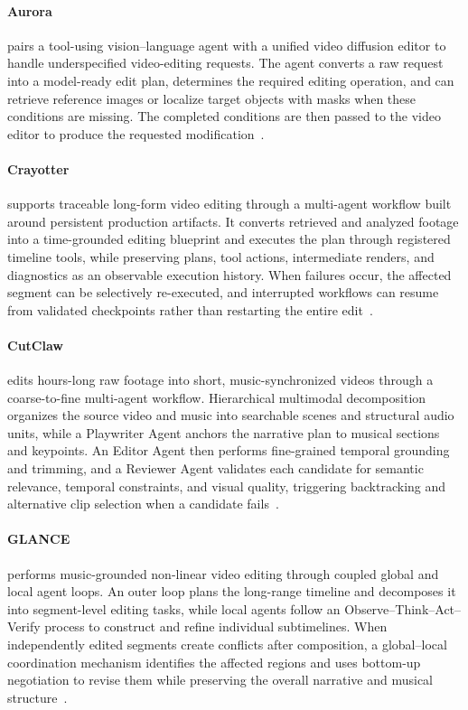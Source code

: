 \paragraph{Aurora}
 pairs a tool-using vision--language agent with a unified video diffusion editor to handle underspecified video-editing requests. The agent converts a raw request into a model-ready edit plan, determines the required editing operation, and can retrieve reference images or localize target objects with masks when these conditions are missing. The completed conditions are then passed to the video editor to produce the requested modification~\cite{avg260518748}.

\paragraph{Crayotter}
 supports traceable long-form video editing through a multi-agent workflow built around persistent production artifacts. It converts retrieved and analyzed footage into a time-grounded editing blueprint and executes the plan through registered timeline tools, while preserving plans, tool actions, intermediate renders, and diagnostics as an observable execution history. When failures occur, the affected segment can be selectively re-executed, and interrupted workflows can resume from validated checkpoints rather than restarting the entire edit~\cite{avg260607636}.

\paragraph{CutClaw}
 edits hours-long raw footage into short, music-synchronized videos through a coarse-to-fine multi-agent workflow. Hierarchical multimodal decomposition organizes the source video and music into searchable scenes and structural audio units, while a Playwriter Agent anchors the narrative plan to musical sections and keypoints. An Editor Agent then performs fine-grained temporal grounding and trimming, and a Reviewer Agent validates each candidate for semantic relevance, temporal constraints, and visual quality, triggering backtracking and alternative clip selection when a candidate fails~\cite{avg260329664}.

\paragraph{GLANCE}
 performs music-grounded non-linear video editing through coupled global and local agent loops. An outer loop plans the long-range timeline and decomposes it into segment-level editing tasks, while local agents follow an Observe--Think--Act--Verify process to construct and refine individual subtimelines. When independently edited segments create conflicts after composition, a global--local coordination mechanism identifies the affected regions and uses bottom-up negotiation to revise them while preserving the overall narrative and musical structure~\cite{avg260405076}.

